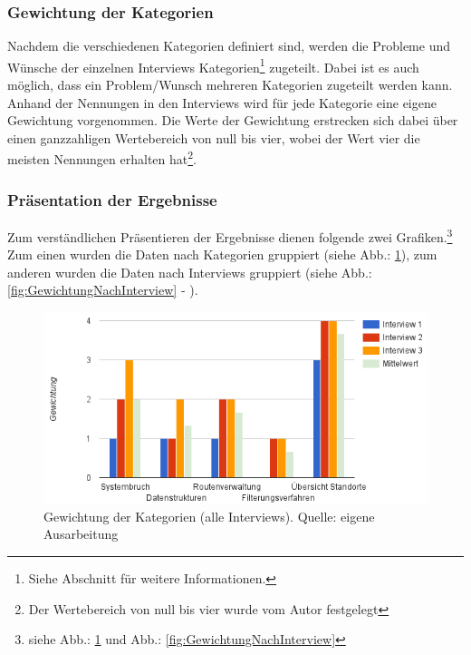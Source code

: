 \documentclass[Bachelorarbeit.tex]{subfiles}
\begin{document}
\subsubsection{Gewichtung der Kategorien}
\label{analyse:gewichtung}

Nachdem die verschiedenen Kategorien definiert sind, werden die Probleme und Wünsche der einzelnen Interviews Kategorien\footnote{
	Siehe Abschnitt  für weitere Informationen.
	}
zugeteilt.
Dabei ist es auch möglich, dass ein Problem/Wunsch mehreren Kategorien zugeteilt werden kann.
Anhand der Nennungen in den Interviews wird für jede Kategorie eine eigene Gewichtung vorgenommen.
Die Werte der Gewichtung erstrecken sich dabei über einen ganzzahligen Wertebereich von null bis vier, wobei der Wert vier die meisten Nennungen erhalten hat\footnote
{Der Wertebereich von null bis vier wurde vom Autor festgelegt}.

\subsubsection{Präsentation der Ergebnisse}
Zum verständlichen Präsentieren der Ergebnisse dienen folgende zwei Grafiken.\footnote
	{siehe Abb.: \ref{fig:KategorienGesamt} und Abb.: \ref{fig:GewichtungNachInterview}}
Zum einen wurden die Daten nach Kategorien gruppiert (siehe Abb.: \ref{fig:KategorienGesamt}),
zum anderen wurden die Daten nach Interviews gruppiert (siehe Abb.: \ref{fig:GewichtungNachInterview} - ).

\begin{figure}[H]
	\centering
	\includegraphics[width=0.9\linewidth]{img/Interviews/KategorienGesamt}
	\caption[Gewichtung der Kategorien (alle Interviews)]{Gewichtung der Kategorien (alle Interviews). Quelle: eigene Ausarbeitung}
	\label{fig:KategorienGesamt}
\end{figure}
\end{document}
